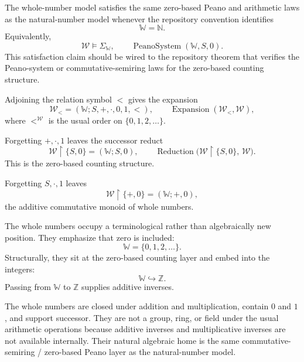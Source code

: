 \begin{remark*}[Satisfaction]
The whole-number model satisfies the same zero-based Peano and arithmetic
laws as the natural-number model whenever the repository convention identifies
\[
\mathbb{W}=\mathbb{N}.
\]
Equivalently,
\[
\mathcal{W}\models \Sigma_{\mathbb{W}},
\qquad
\operatorname{PeanoSystem}(\mathbb{W},S,0).
\]
This satisfaction claim should be wired to the repository theorem that verifies
the Peano-system or commutative-semiring laws for the zero-based counting
structure.
\end{remark*}

\begin{remark*}
Adjoining the relation symbol $<$ gives the expansion
\[
\mathcal{W}_{<}=(\mathbb{W};S,+,\cdot,0,1,<),
\qquad
\operatorname{Expansion}(\mathcal{W}_{<},\mathcal{W}),
\]
where $<^{\mathcal{W}}$ is the usual order on $\{0,1,2,\ldots\}$.
\end{remark*}

\begin{remark*}
Forgetting $+,\cdot,1$ leaves the successor reduct
\[
\mathcal{W}\!\restriction\!\{S,0\}
=
(\mathbb{W};S,0),
\qquad
\operatorname{Reduction}\!\bigl(\mathcal{W}\!\restriction\!\{S,0\},\,\mathcal{W}\bigr).
\]
This is the zero-based counting structure.
\end{remark*}

\begin{remark*}
Forgetting $S,\cdot,1$ leaves
\[
\mathcal{W}\!\restriction\!\{+,0\}
=
(\mathbb{W};+,0),
\]
the additive commutative monoid of whole numbers.
\end{remark*}

\begin{remark*}
The whole numbers occupy a terminological rather than algebraically new
position. They emphasize that zero is included:
\[
\mathbb{W}=\{0,1,2,\ldots\}.
\]
Structurally, they sit at the zero-based counting layer and embed into the
integers:
\[
\mathbb{W}\hookrightarrow\mathbb{Z}.
\]
Passing from $\mathbb{W}$ to $\mathbb{Z}$ supplies additive inverses.
\end{remark*}

\begin{remark*}[Interpretation]
The whole numbers are closed under addition and multiplication, contain $0$
and $1$, and support successor. They are not a group, ring, or field under the
usual arithmetic operations because additive inverses and multiplicative inverses
are not available internally. Their natural algebraic home is the same
commutative-semiring / zero-based Peano layer as the natural-number model.
\end{remark*}

